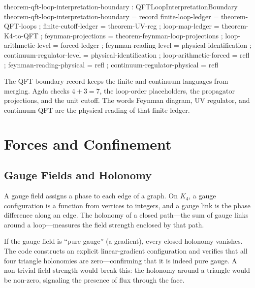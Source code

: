 \documentclass[11pt,a4paper]{book}
\begin{document}
\begin{code}
theorem-qft-loop-interpretation-boundary : QFTLoopInterpretationBoundary
theorem-qft-loop-interpretation-boundary = record
  { finite-loop-ledger          = theorem-QFT-loops
  ; finite-cutoff-ledger        = theorem-UV-reg
  ; loop-map-ledger             = theorem-K4-to-QFT
  ; feynman-projections         = theorem-feynman-loop-projections
  ; loop-arithmetic-level       = forced-ledger
  ; feynman-reading-level       = physical-identification
  ; continuum-regulator-level   = physical-identification
  ; loop-arithmetic-forced      = refl
  ; feynman-reading-physical    = refl
  ; continuum-regulator-physical = refl }
\end{code}

The QFT boundary record keeps the finite and continuum languages from merging.
Agda checks $4+3=7$, the loop-order placeholders, the propagator projections,
and the unit cutoff.  The words Feynman diagram, UV regulator, and continuum
QFT are the physical reading of that finite ledger.

\part*{Forces and Confinement}
\label{part:forces-confinement}

\chapter{Gauge Fields and Holonomy}
\label{ch:gauge-fields}

A gauge field assigns a phase to each edge of a graph. On $K_4$, a gauge configuration is a function from vertices to integers, and a gauge link is the phase difference along an edge. The holonomy of a closed path---the sum of gauge links around a loop---measures the field strength enclosed by that path.

If the gauge field is ``pure gauge'' (a gradient), every closed holonomy vanishes. The code constructs an explicit linear-gradient configuration and verifies that all four triangle holonomies are zero---confirming that it is indeed pure gauge. A non-trivial field strength would break this: the holonomy around a triangle would be non-zero, signaling the presence of flux through the face.
\end{document}
